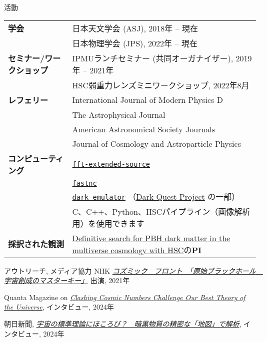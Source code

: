 \begin{rSection}{活動}
  \begin{tabular}{ @{} >{\bfseries}l @{\hspace{6ex}} p{}}
  学会                        & 日本天文学会 (ASJ), 2018年 -- 現在 \\
                              & 日本物理学会 (JPS), 2022年 -- 現在  \\
  セミナー/ワークショップ     & IPMUランチセミナー (共同オーガナイザー), 2019年 -- 2021年 \\
                              & HSC弱重力レンズミニワークショップ, 2022年8月  \\
  レフェリー                  & International Journal of Modern Physics D \\
                              & The Astrophysical Journal \\
                              & American Astronomical Society Journals \\
                              & Journal of Cosmology and Astroparticle Physics \\
  コンピューティング          & \href{https://github.com/git-sunao/fft-extended-source}{\tt fft-extended-source} \\
                              & \href{https://github.com/git-sunao/fastnc}{\tt fastnc} \\
                              & \href{https://dark-emulator.readthedocs.io/en/latest/}{\tt dark emulator} （\href{https://darkquestcosmology.github.io}{Dark Quest Project} の一部） \\
                              & C、C++、Python、HSCパイプライン（画像解析用）を使用できます \\
  採択された観測              & \href{https://subarutelescope.org/Observing/Schedule/S20B_abstract/S20B0032abst.html}{Definitive search for PBH dark matter in the multiverse cosmology with HSC}の\textbf{PI}
  \end{tabular}
\end{rSection}

\begin{rSection}{アウトリーチ, メディア協力}
  NHK \href{https://www.nhk-ondemand.jp/goods/G2021114366SA000/}{\textit{コズミック　フロント　「原始ブラックホール　宇宙創成のマスターキー」}} 出演, 2021年

  Quanta Magazine on \href{https://www.quantamagazine.org/clashing-cosmic-numbers-challenge-our-best-theory-of-the-universe-20240119/}{\textit{Clashing Cosmic Numbers Challenge Our Best Theory of the Universe}}, インタビュー, 2024年
  
  朝日新聞, \href{https://www.asahi.com/articles/ASR4H415RR48ULBH001.html}{\textit{宇宙の標準理論にほころび？　暗黒物質の精密な「地図」で解析}}, インタビュー, 2024年
\end{rSection}
